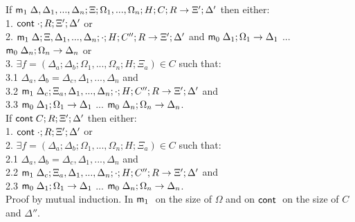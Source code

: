 \documentclass[9pt]{article}
\begin{document}
If $\mathsf{m}_1 \; \Delta, \Delta_1, ..., \Delta_n; \Xi; \Omega_1, ..., \Omega_n; H; C; R \rightarrow \Xi'; \Delta'$ then either:\\
1. \hspace{1cm} $\mathsf{cont} \; \cdot; R; \Xi'; \Delta'$ or \\
2. \hspace{1cm} $\mathsf{m}_1 \; \Delta; \Xi, \Delta_1, ..., \Delta_n; \cdot; H; C''; R \rightarrow \Xi'; \Delta'$ and $\mathsf{m}_0 \; \Delta_1; \Omega_1 \rightarrow \Delta_1$ ... $\mathsf{m}_0 \; \Delta_n; \Omega_n \rightarrow \Delta_n$ or \\
3. \hspace{1cm} $\exists f = (\Delta_a; \Delta_b; \Omega_1, ..., \Omega_n; H; \Xi_a) \in C$ such that:\\
3.1 \hspace{2cm} $\Delta_a, \Delta_b = \Delta_c, \Delta_1, ..., \Delta_n$ and \\
3.2 \hspace{2cm} $\mathsf{m}_1 \; \Delta_c; \Xi_a, \Delta_1, ..., \Delta_n; \cdot; H; C''; R \rightarrow \Xi'; \Delta'$ and \\
3.3 \hspace{2cm} $\mathsf{m}_0 \; \Delta_1; \Omega_1 \rightarrow \Delta_1$ ... $\mathsf{m}_0 \; \Delta_n; \Omega_n \rightarrow \Delta_n$.\\

If $\mathsf{cont} \; C; R; \Xi'; \Delta'$ then either:\\
1. \hspace{1cm} $\mathsf{cont} \; \cdot; R; \Xi'; \Delta'$ or \\
2. \hspace{1cm} $\exists f = (\Delta_a; \Delta_b; \Omega_1, ..., \Omega_n; H; \Xi_a) \in C$ such that:\\
2.1 \hspace{2cm} $\Delta_a, \Delta_b = \Delta_c, \Delta_1, ..., \Delta_n$ and \\
2.2 \hspace{2cm} $\mathsf{m}_1 \; \Delta_c; \Xi_a, \Delta_1, ..., \Delta_n; \cdot; H; C''; R \rightarrow \Xi'; \Delta'$ and \\
2.3 \hspace{2cm} $\mathsf{m}_0 \; \Delta_1; \Omega_1 \rightarrow \Delta_1$ ... $\mathsf{m}_0 \; \Delta_n; \Omega_n \rightarrow \Delta_n$.\\

Proof by mutual induction. In $\mathsf{m}_1 \;$ on the size of $\Omega$ and on $\mathsf{cont} \;$ on the size of $C$ and $\Delta''$.
\end{document}
